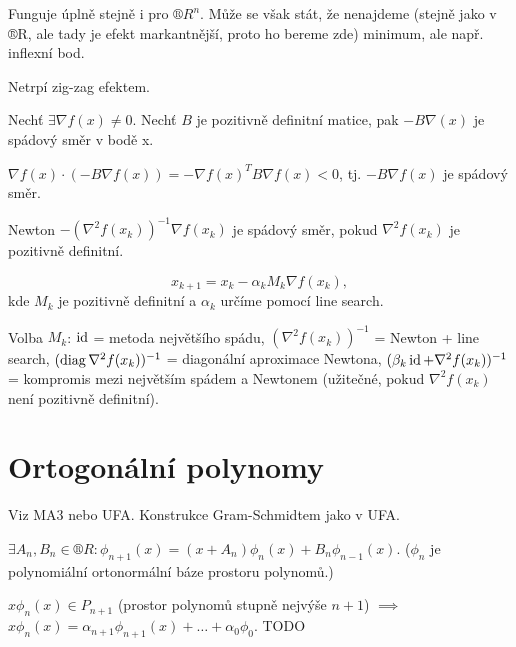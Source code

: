 \documentclass[12pt]{article}					%
\begin{document}

	\begin{definice}
		Funguje úplně stejně i pro $®R^n$. Může se však stát, že nenajdeme (stejně jako v ®R, ale tady je efekt markantnější, proto ho bereme zde) minimum, ale např. inflexní bod.

		Netrpí zig-zag efektem.
	\end{definice}

	\begin{lemma}
		Nechť $\exists \nabla f(x) ≠ 0$. Nechť $B$ je pozitivně definitní matice, pak $- B \nabla (x)$ je spádový směr v bodě x.

		\begin{dukazin}
			$\nabla f(x) · (-B \nabla f(x)) = - \nabla f(x)^T B \nabla f(x) < 0$, tj. $-B \nabla f(x)$ je spádový směr.
		\end{dukazin}
	\end{lemma}

	\begin{dusledek}
		Newton $-(\nabla^2 f(x_k))^{-1} \nabla f(x_k)$ je spádový směr, pokud $\nabla^2 f(x_k)$ je pozitivně definitní.
	\end{dusledek}

	\begin{definice}
		$$ x_{k+1} = x_k - \alpha_k M_k \nabla f(x_k), $$
		kde $M_k$ je pozitivně definitní a $\alpha_k$ určíme pomocí line search.

		\begin{poznamkain}
			Volba $M_k$: $\operatorname{id}$ = metoda největšího spádu, $(\nabla^2 f(x_k))^{-1}$ = Newton + line search, \break$(\operatorname{diag} \nabla^2 f(x_k))^{-1}$ = diagonální aproximace Newtona, $(\beta_k \operatorname{id} + \nabla^2 f(x_k))^{-1}$ = kompromis mezi největším spádem a Newtonem (užitečné, pokud $\nabla^2 f(x_k)$ není pozitivně definitní).
		\end{poznamkain}
	\end{definice}

\section{Ortogonální polynomy}
Viz MA3 nebo UFA. Konstrukce Gram-Schmidtem jako v UFA.

\begin{veta}
	$\exists A_n, B_n \in ®R: \phi_{n+1}(x) = (x + A_n)\phi_n(x) + B_n\phi_{n-1}(x)$. ($\phi_n$ je polynomiální ortonormální báze prostoru polynomů.)

	\begin{dukazin}
		$x \phi_n(x) \in P_{n+1}$ (prostor polynomů stupně nejvýše $n+1$) $\implies$ $x\phi_n(x) = \alpha_{n+1} \phi_{n+1}(x) + … + \alpha_0 \phi_0$. TODO
	\end{dukazin}
\end{veta}
\end{document}

